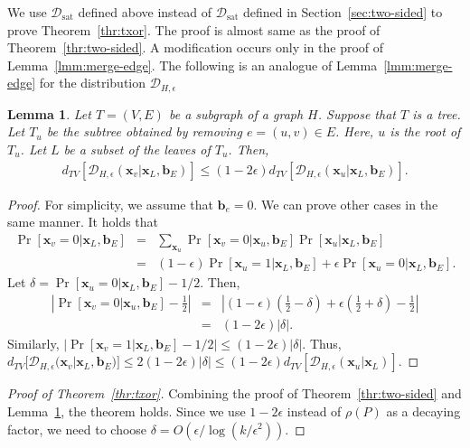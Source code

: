 \documentclass[letterpaper,11pt]{article}
\newtheorem{lemma}[theorem]{Lemma}
\newcommand{\dtv}{d_{TV}}
\newcommand{\cald}{\mathcal{D}}
\newcommand{\caldsat}{\mathcal{D}_{\mathrm{sat}}}
\newcommand{\bfx}{\mathbf{x}}
\newcommand{\bfb}{\mathbf{b}}
\begin{document}
We use $\caldsat$ defined above instead of $\caldsat$ defined in Section~\ref{sec:two-sided} to prove Theorem~\ref{thr:txor}.
The proof is almost same as the proof of Theorem~\ref{thr:two-sided}.
A modification occurs only in the proof of Lemma~\ref{lmm:merge-edge}.
The following is an analogue of Lemma~\ref{lmm:merge-edge} for the distribution $\cald_{H,\epsilon}$
\begin{lemma}\label{lmm:merge-edge-txor}
  Let $T=(V,E)$ be a subgraph of a graph $H$.
  Suppose that $T$ is a tree.
  Let $T_u$ be the subtree obtained by removing $e=(u,v)\in E$.
  Here, $u$ is the root of $T_u$.
  Let $L$ be a subset of the leaves of $T_u$.
  Then,
  \begin{eqnarray*}
    \dtv[\cald_{H,\epsilon}(\bfx_{v}|\bfx_L,\bfb_E)]\leq (1-2\epsilon)\dtv[\cald_{H,\epsilon}(\bfx_u|\bfx_{L},\bfb_E)].
  \end{eqnarray*}
\end{lemma}
\begin{proof}
  For simplicity, 
  we assume that $\bfb_e=0$.
  We can prove other cases in the same manner.
  It holds that 
  \begin{eqnarray*}
    \Pr[\bfx_v=0|\bfx_L,\bfb_E]
    &=&
    \sum_{\bfx_u}\Pr[\bfx_v=0|\bfx_u,\bfb_E]\Pr[\bfx_u|\bfx_L,\bfb_E]\\
    &=&
    (1-\epsilon)\Pr[\bfx_u=1|\bfx_L,\bfb_E]+\epsilon\Pr[\bfx_u=0|\bfx_L,\bfb_E].
  \end{eqnarray*}
  Let $\delta=\Pr[\bfx_u=0|\bfx_L,\bfb_E]-1/2$.
  Then,
  \begin{eqnarray*}
    \left| \Pr[\bfx_v=0|\bfx_u,\bfb_E]-\frac{1}{2} \right| 
    &=&
    \left| (1-\epsilon)(\frac{1}{2}-\delta)+\epsilon(\frac{1}{2}+\delta)-\frac{1}{2} \right|\\
    &=& 
    (1-2\epsilon)|\delta|.
  \end{eqnarray*}
  Similarly, $\left|\Pr[\bfx_v=1|\bfx_L,\bfb_E]-1/2\right| \leq (1-2\epsilon)|\delta|$.
  Thus, 
  $\dtv[\cald_{H,\epsilon}(\bfx_v|\bfx_L,\bfb_E)] \leq 2(1-2\epsilon)|\delta| \leq (1-2\epsilon)\dtv[\cald_{H,\epsilon}(\bfx_u|\bfx_L)]$.
\end{proof}
\begin{proof}[Proof of Theorem~\ref{thr:txor}]
  Combining the proof of Theorem~\ref{thr:two-sided} and Lemma~\ref{lmm:merge-edge-txor}, 
  the theorem holds.
  Since we use $1-2\epsilon$ instead of $\rho(P)$ as a decaying factor,
  we need to choose $\delta=O(\epsilon / \log (k/\epsilon^2))$.
\end{proof}
\end{document}
